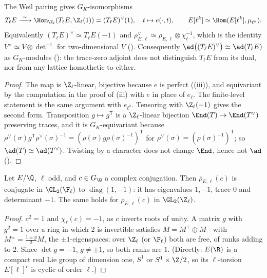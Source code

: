 \begin{corollary}\label{cor:ellcurves:dual-T}
The Weil pairing gives $G_K$-isomorphisms
\[
T_\ell E\xrightarrow{\ \sim\ }\Hom_{\Z_\ell}(T_\ell E,\Z_\ell(1))=(T_\ell E)^\vee(1),\quad t\mapsto e(\cdot,t),\qquad E[\ell^k]\simeq\Hom(E[\ell^k],\mu_{\ell^k}).
\]
Equivalently $(T_\ell E)^\vee\simeq T_\ell E(-1)$ and $\rho_{E,\ell}^\vee\simeq\rho_{E,\ell}\otimes\chi_\ell^{-1}$, which is the identity $V^\vee\simeq V\otimes\det^{-1}$ for two-dimensional $V$
(). Consequently $\ad\bigl((T_\ell E)^\vee\bigr)\simeq\ad(T_\ell E)$ as $G_K$-modules (): the trace-zero adjoint does not distinguish $T_\ell E$ from its dual,
nor from any lattice homothetic to either.
\end{corollary}

\begin{proof}
The map is $\Z_\ell$-linear, bijective because $e$ is perfect ((iii)), and equivariant by the computation in the proof of
(iii) with $e$ in place of $e_\ell$. The finite-level statement is the same argument with $e_{\ell^k}$. Tensoring with $\Z_\ell(-1)$ gives the second form.
Transposition $g\mapsto g^{\mathsf T}$ is a $\Z_\ell$-linear bijection $\End(T)\to\End(T^\vee)$ preserving traces, and it is $G_K$-equivariant because
$\rho^\vee(\sigma)g^{\mathsf T}\rho^\vee(\sigma)^{-1}=(\rho(\sigma)g\rho(\sigma)^{-1})^{\mathsf T}$ for $\rho^\vee(\sigma)=(\rho(\sigma)^{-1})^{\mathsf T}$; so $\ad(T)\simeq\ad(T^\vee)$. Twisting by a
character does not change $\End$, hence not $\ad$ ().
\end{proof}

\begin{corollary}\label{cor:ellcurves:complex-conj}
Let $E/\Q$, $\ell$ odd, and $c\in G_\Q$ a complex conjugation. Then $\bar\rho_{E,\ell}(c)$ is conjugate in $\GL_2(\F_\ell)$ to $\operatorname{diag}(1,-1)$: it has eigenvalues
$1,-1$, trace $0$ and determinant $-1$. The same holds for $\rho_{E,\ell}(c)$ in $\GL_2(\Z_\ell)$.
\end{corollary}

\begin{proof}
$c^2=1$ and $\chi_\ell(c)=-1$, as $c$ inverts roots of unity. A matrix $g$ with $g^2=1$ over a ring in which $2$ is invertible satisfies $M=M^+\oplus M^-$ with
$M^\pm=\frac{1\pm g}2M$, the $\pm1$-eigenspaces; over $\Z_\ell$ (or $\F_\ell$) both are free, of ranks adding to $2$. Since $\det g=-1$, $g\ne\pm1$, so both ranks are $1$. (Directly: $E(\R)$ is
a compact real Lie group of dimension one, $S^1$ or $S^1\times\Z/2$, so its $\ell$-torsion $E[\ell]^{c}$ is cyclic of order $\ell$.)
\end{proof}

